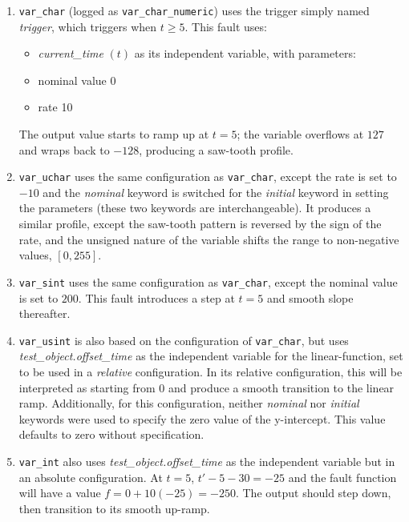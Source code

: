 \documentclass[11pt,fleqn]{report}
\begin{document}
\begin{enumerate}
\subsubsection{Linear Function} \label{sec:verif:FM:function:linear}
 \item \verb'var_char' (logged as \verb'var_char_numeric') uses the trigger
   simply named \textit{trigger}, which triggers when $t\geq5$. This fault uses:

   \begin {itemize}
     \item \textit{current\_time} $(t)$ as its independent variable, with
       parameters:
     \item nominal value 0
     \item rate 10
   \end{itemize}
   The output value starts to ramp up at $t=5$; the variable overflows at $127$
   and wraps back to $-128$, producing a saw-tooth profile.

 \item \verb'var_uchar' uses the same configuration as \verb'var_char', except
   the rate is set to $-10$ and the \textit{nominal} keyword is switched for the
   \textit{initial} keyword in setting the parameters (these two keywords
   are interchangeable). It produces a similar
   profile, except the saw-tooth
   pattern is reversed by the sign of the rate, and the unsigned nature of the
   variable shifts the range to non-negative values, $[0,255]$.

 \item \verb'var_sint' uses the same configuration as \verb'var_char', except
   the nominal value is set to $200$. This fault introduces a step at $t=5$ and
   smooth slope thereafter.

 \item \verb'var_usint' is also based on the configuration of \verb'var_char',
   but uses \textit{test\_object.offset\_time} as the independent
   variable for the linear-function, set to be used in a \textit{relative}
   configuration. In its relative configuration, this will be interpreted as
   starting from $0$ and produce a smooth transition to the linear ramp.
   Additionally, for this configuration, neither \textit{nominal} nor
   \textit{initial} keywords were used to specify the zero value of the
   y-intercept. This value defaults to zero without specification.

 \item \verb'var_int' also uses \textit{test\_object.offset\_time} as the
   independent variable but in an absolute configuration. At $t=5$,
   $t'-5-30=-25$ and the fault function will have a value $f=0+10(-25)=-250$.
   The output should step down, then transition to its smooth up-ramp.


\end{enumerate}
\end{document}
